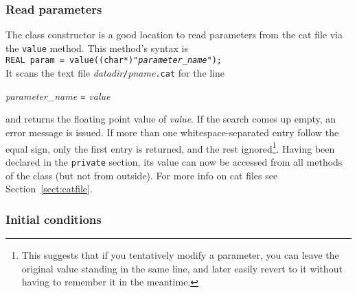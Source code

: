 \subsubsection{Read parameters}

The class constructor is a good location to read parameters from the cat file
via the {\tt value} method. This method's syntax is\\
{\tt REAL param = value((char*)"{\it parameter\_name}");}\\
It scans the text file {\it datadir}{\tt /}{\it pname}{\tt .cat} for
the line\\
\centerline{\it parameter\_name {\tt =} value}
and returns the floating point value of {\it value}. If the search
comes up empty, an error message is issued. If more than one
whitespace-separated entry follow the equal sign, only the first
entry is returned, and the rest ignored\footnote{This suggests that if
you tentatively modify a parameter, you can leave the original value
standing in the same line, and later easily revert to it without
having to remember it in the meantime.}.
Having been declared in the {\tt private} section, its value can now
be accessed from all methods of the class (but not from outside). For
more info on cat files see Section~\ref{sect:catfile}.

\subsubsection{Initial conditions}
\label{sec:init_fields}

